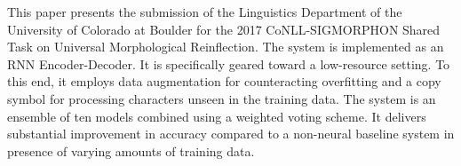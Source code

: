 This paper presents the submission of the Linguistics Department of the University of Colorado at Boulder for the 2017 CoNLL-SIGMORPHON Shared Task on Universal Morphological Reinflection. The system is implemented as an RNN Encoder-Decoder. It is specifically geared toward a low-resource setting. To this end, it employs data augmentation for counteracting overfitting and a copy symbol for processing characters unseen in the training data. The system is an ensemble of ten models combined using a weighted voting scheme. It delivers substantial improvement in accuracy compared to a non-neural baseline system in presence of varying amounts of training data.
